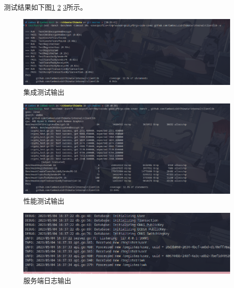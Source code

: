 测试结果如下图\ref*{Fig:test} \ref*{Fig:benchmark} \ref*{Fig:server}所示。

\begin{figure}[ht]
    \centering
    \includegraphics[width=0.8\linewidth]{./Figures/Test.png}
    \caption{集成测试输出}\label{Fig:test}
\end{figure}

\begin{figure}[ht]
    \centering
    \includegraphics[width=0.8\linewidth]{./Figures/Benchmark.png}
    \caption{性能测试输出}\label{Fig:benchmark}
\end{figure}

\begin{figure}[ht]
    \centering
    \includegraphics[width=0.8\linewidth]{./Figures/Server.png}
    \caption{服务端日志输出}\label{Fig:server}
\end{figure}
